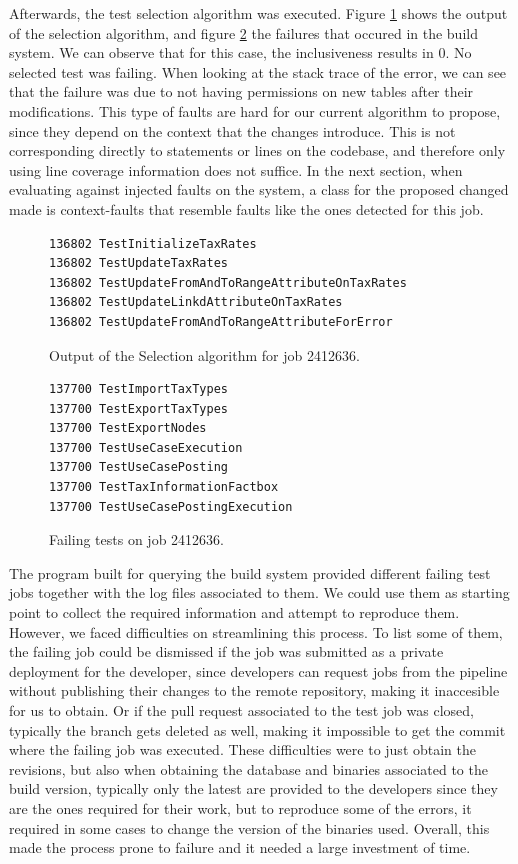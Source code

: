\documentclass{article}
\begin{document}
Afterwards, the test selection algorithm was executed. Figure \ref{fig:eval-alg-out} shows the output of the selection algorithm, and figure \ref{fig:eval-failures} the failures that occured in the build system. We can observe that for this case, the inclusiveness results in 0. No selected test was failing. When looking at the stack trace of the error, we can see that the failure was due to not having permissions on new tables after their modifications. This type of faults are hard for our current algorithm to propose, since they depend on the context that the changes introduce. This is not corresponding directly to statements or lines on the codebase, and therefore only using line coverage information does not suffice. In the next section, when evaluating against injected faults on the system, a class for the proposed changed made is context-faults that resemble faults like the ones detected for this job.


\begin{figure}[H]\label{fig:eval-alg-out}
\begin{verbatim}
136802 TestInitializeTaxRates
136802 TestUpdateTaxRates
136802 TestUpdateFromAndToRangeAttributeOnTaxRates
136802 TestUpdateLinkdAttributeOnTaxRates
136802 TestUpdateFromAndToRangeAttributeForError 
\end{verbatim}
\caption{Output of the Selection algorithm for job 2412636.}
\end{figure}

\begin{figure}[H]\label{fig:eval-failures}
\begin{verbatim}
137700 TestImportTaxTypes
137700 TestExportTaxTypes
137700 TestExportNodes
137700 TestUseCaseExecution
137700 TestUseCasePosting
137700 TestTaxInformationFactbox
137700 TestUseCasePostingExecution
\end{verbatim}
\caption{Failing tests on job 2412636.}
\end{figure}

The program built for querying the build system provided different failing test jobs together with the log files associated to them. We could use them as starting point to collect the required information and attempt to reproduce them. However, we faced difficulties on streamlining this process. To list some of them, the failing job could be dismissed if the job was submitted as a private deployment for the developer, since developers can request jobs from the pipeline without publishing their changes to the remote repository, making it inaccesible for us to obtain. Or if the pull request associated to the test job was closed, typically the branch gets deleted as well, making it impossible to get the commit where the failing job was executed. These difficulties were to just obtain the revisions, but also when obtaining the database and binaries associated to the build version, typically only the latest are provided to the developers since they are the ones required for their work, but to reproduce some of the errors, it required in some cases to change the version of the binaries used. Overall, this made the process prone to failure and it needed a large investment of time.
\end{document}
